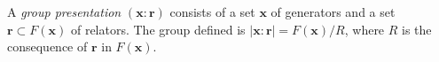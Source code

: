 A \textit{group presentation} $(\mathbf{x} : \mathbf{r})$ consists of a set $\mathbf{x}$ of generators and a set $\mathbf{r} \subset F(\mathbf{x})$ of relators. The group defined is $|\mathbf{x} : \mathbf{r}| = F(\mathbf{x})/R$, where $R$ is the consequence of $\mathbf{r}$ in $F(\mathbf{x})$.

